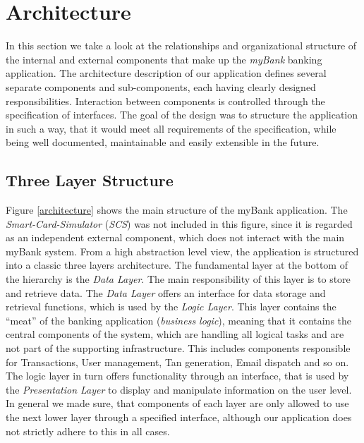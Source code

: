 \chapter{Architecture}
In this section we take a look at the relationships and organizational structure of the internal and external components that make up the \textit{myBank} banking application. The architecture description of our application defines several separate components and sub-components, each having clearly designed responsibilities. Interaction between components is controlled through the specification of interfaces. The goal of the design was to structure the application in such a way, that it would meet all requirements of the specification, while being well documented, maintainable and easily extensible in the future.
\section{Three Layer Structure}
Figure \ref{architecture} shows the main structure of the myBank application. The \textit{Smart-Card-Simulator} (\textit{SCS}) was not included in this figure, since it is regarded as an independent external component, which does not interact with the main myBank system. From a high abstraction level view, the application is structured into a classic three layers architecture. The fundamental layer at the bottom of the hierarchy is the \textit{Data Layer}. The main responsibility of this layer is to store and retrieve data. The \textit{Data Layer} offers an interface for data storage and retrieval functions, which is used by the \textit{Logic Layer}. This layer contains the ``meat'' of the banking application (\textit {business logic}), meaning that it contains the central components of the system, which are handling all logical tasks and are not part of the supporting infrastructure. This includes components responsible for Transactions, User management, Tan generation, Email dispatch and so on. The logic layer in turn offers functionality through an interface, that is used by the \textit{Presentation Layer} to display and manipulate information on the user level. In general we made sure, that components of each layer are only allowed to use the next lower layer through a specified interface, although our application does not strictly adhere to this in all cases.
